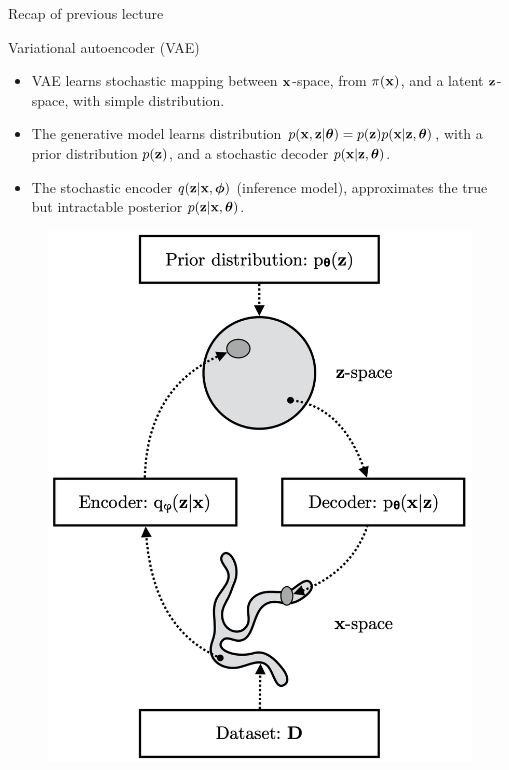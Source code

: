 \begin{frame}{Recap of previous lecture}
	\begin{minipage}[t]{0.55\columnwidth}
		\begin{block}{Variational autoencoder (VAE)}
		    \begin{itemize}
			    \item VAE learns stochastic mapping between $\mathbf{x}$-space, from $\pi(\mathbf{x})$, and a latent $\mathbf{z}$-space, with simple distribution. 
			    \item The generative model learns  distribution $p(\mathbf{x}, \mathbf{z} | \boldsymbol{\theta}) = p(\mathbf{z}) p(\mathbf{x} |\mathbf{z}, \boldsymbol{\theta})$, with a prior distribution $p(\mathbf{z})$, and a stochastic decoder $p(\mathbf{x}|\mathbf{z}, \boldsymbol{\theta})$. 
			    \item The stochastic encoder $q(\mathbf{z}|\mathbf{x}, \boldsymbol{\phi})$ (inference model), approximates the true but intractable posterior $p(\mathbf{z}|\mathbf{x}, \boldsymbol{\theta})$.
		    \end{itemize}
	    \end{block}
	\end{minipage}%
	\begin{minipage}[t]{0.45\columnwidth}
		\vspace{0.7cm}
		\begin{figure}[h]
			\centering
			\includegraphics[width=\linewidth]{figs/vae_scheme}
		\end{figure}
	\end{minipage}
	
\end{frame}
